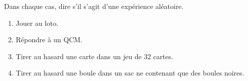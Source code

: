 Dans chaque cas, dire s'il s'agit d'une expérience aléatoire.
\begin{enumerate}
    \item Jouer au loto.
    \item Répondre à un QCM.
    \item Tirer au hasard une carte dans un jeu de 32 cartes.
    \item Tirer au hasard une boule dans un sac ne contenant que des boules noires.
\end{enumerate}